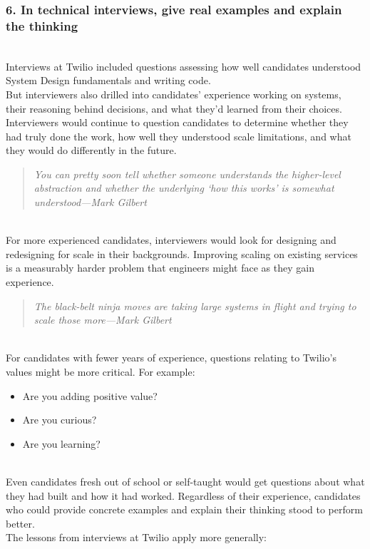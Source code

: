 \subsubsection{6. In technical interviews, give real examples and explain the thinking}\label{GuCywAoTJwLD2MZcGqHMW}
\\
Interviews at Twilio included questions assessing how well candidates understood System Design fundamentals and writing code.
\\
But interviewers also drilled into candidates' experience working on systems, their reasoning behind decisions, and what they'd learned from their choices. Interviewers would continue to question candidates to determine whether they had truly done the work, how well they understood scale limitations, and what they would do differently in the future.
\begin{quote}
\emph{You can pretty soon tell whether someone understands the higher-level abstraction and whether the underlying `how this works' is somewhat understood---Mark Gilbert}
\end{quote}
\\
For more experienced candidates, interviewers would look for designing and redesigning for scale in their backgrounds. Improving scaling on existing services is a measurably harder problem that engineers might face as they gain experience.
\begin{quote}
\emph{The black-belt ninja moves are taking large systems in flight and trying to scale those more---Mark Gilbert}
\end{quote}
\\
For candidates with fewer years of experience, questions relating to Twilio's values might be more critical. For example:

\begin{itemize}
\item
\protect{}\label{jjBgwkqOkIwal8o6xvCZG}
Are you adding positive value?
\item
\protect{}\label{9A7Tfu0nLxW14s9LTPRtL}
Are you curious?
\item
\protect{}\label{J3tLqghGVov3-qEZgjtse}
Are you learning?
\end{itemize}
\\
Even candidates fresh out of school or self-taught would get questions about what they had built and how it had worked. Regardless of their experience, candidates who could provide concrete examples and explain their thinking stood to perform better.
\\
The lessons from interviews at Twilio apply more generally:

